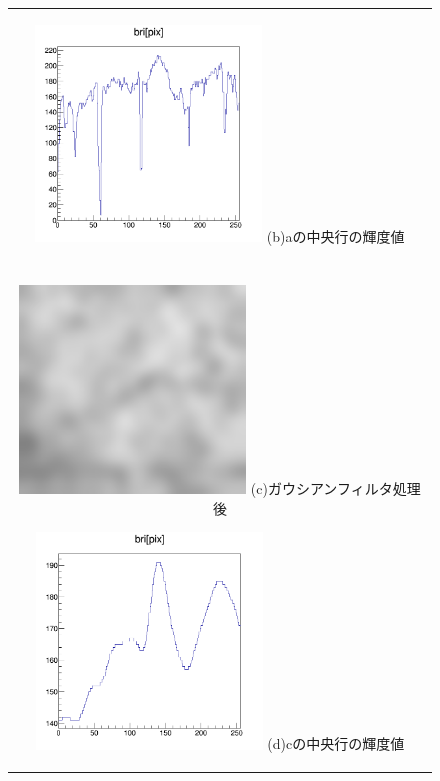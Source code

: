 \documentclass[12pt,a4paper]{jarticle}
\begin{document}
\begin{figure}[htbp]
\begin{center}
\begin{tabular}{c}
        \begin{minipage}{0.5\hsize}
          \begin{center}
            \includegraphics[clip, width=60mm]{cont_hist2.png}
            \hspace{1.6cm} (b)aの中央行の輝度値
          \end{center}
        \end{minipage}
        \\
        \\
        \begin{minipage}{0.5\hsize}
            \begin{center}
              \includegraphics[clip, width=60mm]{gau2.png}
              \hspace{1.6cm} (c)ガウシアンフィルタ処理後
            \end{center}
          \end{minipage}
          
        \begin{minipage}{0.5\hsize}
            \begin{center}
              \includegraphics[clip, width=60mm]{gau2_hist.png}
              \hspace{1.6cm} (d)cの中央行の輝度値
            \end{center}
        \end{minipage}
    

\end{tabular}
\end{center}
\end{figure}
\end{document}
